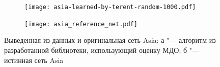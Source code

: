 \begin{figure}[ht]
\centering
  \begin{subfigure}[b]{0.49\textwidth} 
    \centering
    \texttt{[image: asia-learned-by-terent-random-1000.pdf]}  
    \caption{}
  \end{subfigure}
  \begin{subfigure}[b]{0.48\textwidth} 
    \centering
    \texttt{[image: asia\_reference\_net.pdf]}  
    \caption{}
  \end{subfigure}

  \caption{ Выведенная из данных и оригинальная сеть Asia: а "--- алгоритм из разработанной библиотеки, использующий оценку МДО;
            б "--- истинная сеть Asia}
  \label{fig:domain:programs:our_impl_plus_asia}
\end{figure}